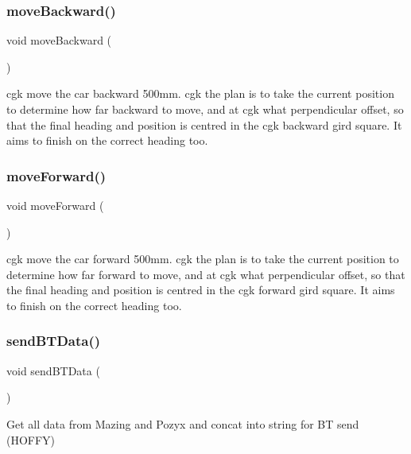\subsubsection{\texorpdfstring{move\+Backward()}{moveBackward()}}
{\footnotesize\ttfamily void move\+Backward (\begin{DoxyParamCaption}{ }\end{DoxyParamCaption})}

cgk move the car backward 500mm. cgk the plan is to take the current position to determine how far backward to move, and at cgk what perpendicular offset, so that the final heading and position is centred in the cgk backward gird square. It aims to finish on the correct heading too. \mbox{\label{bot_main_8ino_a618d986e214be5b102686274ac420be0}} 
\subsubsection{\texorpdfstring{move\+Forward()}{moveForward()}}
{\footnotesize\ttfamily void move\+Forward (\begin{DoxyParamCaption}{ }\end{DoxyParamCaption})}

cgk move the car forward 500mm. cgk the plan is to take the current position to determine how far forward to move, and at cgk what perpendicular offset, so that the final heading and position is centred in the cgk forward gird square. It aims to finish on the correct heading too. \mbox{\label{bot_main_8ino_a9c7adb3a38b0de84b613e166666630d6}} 
\subsubsection{\texorpdfstring{send\+B\+T\+Data()}{sendBTData()}}
{\footnotesize\ttfamily void send\+B\+T\+Data (\begin{DoxyParamCaption}{ }\end{DoxyParamCaption})}



Get all data from Mazing and Pozyx and concat into string for BT send (H\+O\+F\+FY) 

